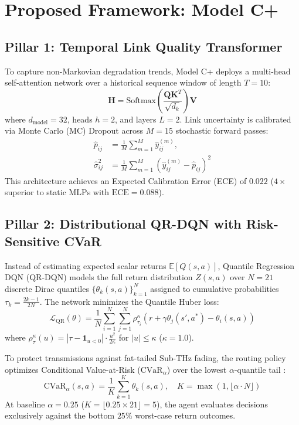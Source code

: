 \documentclass[conference]{IEEEtran}
\begin{document}
\section{Proposed Framework: Model C+}

\subsection{Pillar 1: Temporal Link Quality Transformer}
To capture non-Markovian degradation trends, Model C+ deploys a multi-head self-attention network over a historical sequence window of length $T=10$:
\begin{equation}
\mathbf{H} = \text{Softmax}\left(\frac{\mathbf{Q}\mathbf{K}^T}{\sqrt{d_k}}\right)\mathbf{V}
\end{equation}
where $d_{\text{model}} = 32$, heads $h=2$, and layers $L=2$. Link uncertainty is calibrated via Monte Carlo (MC) Dropout across $M=15$ stochastic forward passes:
\begin{equation}
\begin{aligned}
\hat{p}_{ij} &= \frac{1}{M}\sum_{m=1}^M \hat{y}_{ij}^{(m)}, \\
\hat{\sigma}_{ij}^2 &= \frac{1}{M}\sum_{m=1}^M \left(\hat{y}_{ij}^{(m)} - \hat{p}_{ij}\right)^2
\end{aligned}
\end{equation}
This architecture achieves an Expected Calibration Error (ECE) of $\mathbf{0.022}$ ($4\times$ superior to static MLPs with $\text{ECE}=0.088$).

\subsection{Pillar 2: Distributional QR-DQN with Risk-Sensitive CVaR}
Instead of estimating expected scalar returns $\mathbb{E}[Q(s, a)]$, Quantile Regression DQN (QR-DQN) \cite{dabney2018distributional} models the full return distribution $Z(s, a)$ over $N=21$ discrete Dirac quantiles $\{\theta_k(s, a)\}_{k=1}^N$ assigned to cumulative probabilities $\tau_k = \frac{2k - 1}{2N}$. The network minimizes the Quantile Huber loss:
\begin{equation}
\mathcal{L}_{\text{QR}}(\theta) = \frac{1}{N}\sum_{i=1}^N \sum_{j=1}^N \rho_{\tau_i}^\kappa \left(r + \gamma \theta_j(s', a^*) - \theta_i(s, a)\right)
\end{equation}
where $\rho_\tau^\kappa(u) = |\tau - \mathbf{1}_{u < 0}| \cdot \frac{u^2}{2\kappa}$ for $|u| \le \kappa$ ($\kappa=1.0$).

To protect transmissions against fat-tailed Sub-THz fading, the routing policy optimizes Conditional Value-at-Risk ($\text{CVaR}_\alpha$) over the lowest $\alpha$-quantile tail \cite{rockafellar2000optimization}:
\begin{equation}
\text{CVaR}_\alpha(s, a) = \frac{1}{K} \sum_{k=1}^K \theta_k(s, a), \quad K = \max(1, \lfloor \alpha \cdot N \rfloor)
\end{equation}
At baseline $\alpha = 0.25$ ($K = \lfloor 0.25 \times 21 \rfloor = 5$), the agent evaluates decisions exclusively against the bottom $25\%$ worst-case return outcomes.
\end{document}
